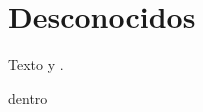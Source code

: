 \documentclass{article}
\begin{document}
\section{Desconocidos}
Texto  y \otherthing.
\begin{weirdenv}dentro\end{weirdenv}
\end{document}

